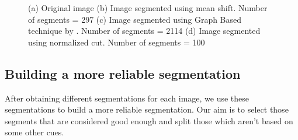 \documentclass[twoside,11pt]{article}
\begin{document}
\begin{figure}[!t]
\centering
{}
\caption{(a) Original image (b) Image segmented using mean shift. Number of
segments = 297 (c) Image segmented using Graph Based technique by
\cite{Felzenszwalb04efficientgraph-based}. Number of segments = 2114 (d) Image
segmented using normalized cut. Number of segments = 100}
\label{fig:allsegs}
\end{figure}

\subsection{Building a more reliable segmentation}

After obtaining different segmentations for each image, we use these
segmentations to build a more reliable segmentation. Our aim is to select
those segments that are considered good enough and split those which aren't
based on some other cues.
\end{document}
